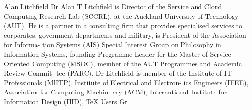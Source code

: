 \documentclass{ieeeaccess}
\begin{document}
\begin{IEEEbiography}{Alan Litchfield} Dr Alan T Litchfield is Director of the Service and Cloud Computing Research Lab (SCCRL), at the Auckland University of Technology (AUT). He is a partner in a consulting firm that provides specialised services to corporates, government departments and military, is President of the Association for Informa- tion Systems (AIS) Special Interest Group on Philosophy in Information Systems, founding Programme Leader for the Master of Service Oriented Computing (MSOC), member of the AUT Programmes and Academic Review Commit- tee (PARC). Dr Litchfield is member of the Institute of IT Professionals (MIITP), Institute of Electrical and Electron- ics Engineers (IEEE), Association for Computing Machin- ery (ACM), International Institute for Information Design (IIID), TeX Users Gr
\end{IEEEbiography}

\EOD
\end{document}
